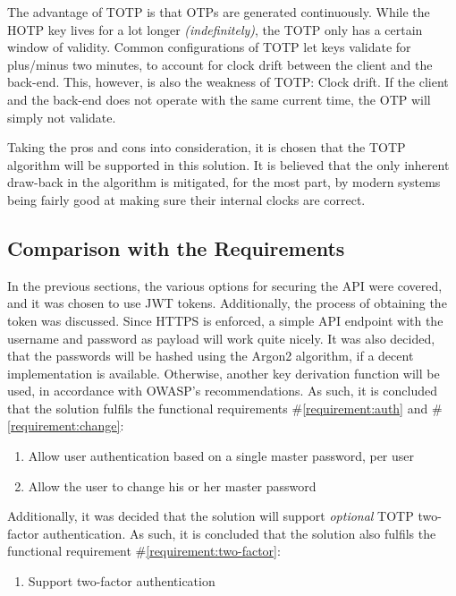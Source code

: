 				The advantage of TOTP is that OTPs are generated continuously. While the HOTP key lives for a lot longer \emph{(indefinitely)}, the TOTP only has a certain window of validity. Common configurations of TOTP let keys validate for plus/minus two minutes, to account for clock drift between the client and the back-end. This, however, is also the weakness of TOTP: Clock drift. If the client and the back-end does not operate with the same current time, the OTP will simply not validate.

				Taking the pros and cons into consideration, it is chosen that the TOTP algorithm will be supported in this solution. It is believed that the only inherent draw-back in the algorithm is mitigated, for the most part, by modern systems being fairly good at making sure their internal clocks are correct.

		\subsection{Comparison with the Requirements}
			\label{requirement:fulfilled:auth}
			\label{requirement:fulfilled:change}
			\label{requirement:fulfilled:two-factor}
			In the previous sections, the various options for securing the API were covered, and it was chosen to use JWT tokens. Additionally, the process of obtaining the token was discussed. Since HTTPS is enforced, a simple API endpoint with the username and password as payload will work quite nicely. It was also decided, that the passwords will be hashed using the Argon2 algorithm, if a decent implementation is available. Otherwise, another key derivation function will be used, in accordance with OWASP's recommendations. As such, it is concluded that the solution fulfils the functional requirements \#\ref{requirement:auth} and \#\ref{requirement:change}:

			\vspace{-3ex}\begin{enumerate}
				\setlength\itemsep{0.1em}
				\setcounter{enumi}{14-1}
				\item Allow user authentication based on a single master password, per user
				\item Allow the user to change his or her master password
			\end{enumerate}

			Additionally, it was decided that the solution will support \emph{optional} TOTP two-factor authentication. As such, it is concluded that the solution also fulfils the functional requirement \#\ref{requirement:two-factor}:
			\vspace{-3ex}\begin{enumerate}
				\setlength\itemsep{0.1em}
				\setcounter{enumi}{16-1}
				\item Support two-factor authentication
			\end{enumerate}

